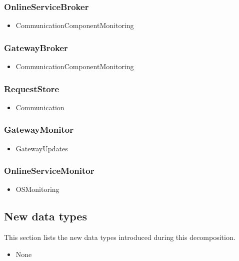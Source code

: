    \subsubsection{OnlineServiceBroker}
        \begin{itemize}
            \item CommunicationComponentMonitoring
        \end{itemize}

    \subsubsection{GatewayBroker}
        \begin{itemize}
            \item CommunicationComponentMonitoring
        \end{itemize}

    \subsubsection{RequestStore}
        \begin{itemize}
            \item Communication
        \end{itemize}

    \subsubsection{GatewayMonitor}
        \begin{itemize}
            \item GatewayUpdates
        \end{itemize}

    \subsubsection{OnlineServiceMonitor}
        \begin{itemize}
            \item OSMonitoring
        \end{itemize}

\subsection{New data types}
    This section lists the new data types introduced during this decomposition.

    \begin{itemize}
        \item None
    \end{itemize}

